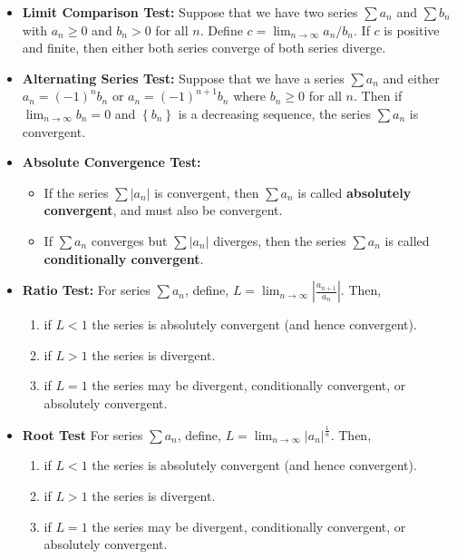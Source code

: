 \documentclass{article}
\newenvironment{bx}[1][]{
\begin{tcolorbox}[colback=white!97!black, title=#1, arc=0in, halign=flush left, left=1mm, right=1mm,]
}{
\end{tcolorbox}
}
\begin{document}
\begin{multicols}{2}
\begin{bx}[Test for Convergence and Divergence]
\begin{itemize}[leftmargin=1em]
\item \textbf{Limit Comparison Test:}
Suppose that we have two series $\sum a_n$ and $\sum b_n$ with $a_n\geq 0$ and $b_n > 0$ for all $n$. Define $c=\lim_{n\to\infty}{a_n}/{b_n}.$ If $c$ is positive and finite, then either both series converge of both series diverge.


\item \textbf{Alternating Series Test:}
Suppose that we have a series $\sum a_{n}$ and either $a_{n}=(-1)^{n} b_{n}$ or $a_{n}=(-1)^{n+1} b_{n}$ where $b_{n} \geq 0$ for all $n .$ Then if ${\displaystyle\lim _{n \to \infty}} b_{n}=0$ and $\left\{b_{n}\right\}$ is a decreasing sequence, the series $\sum a_{n}$ is convergent.


\item \textbf{Absolute Convergence Test:}
\phantom{}
\begin{itemize}[leftmargin=1em]
    \item If the series $\sum |a_n|$ is convergent, then $\sum a_n$ is called \textbf{absolutely convergent}, and must also be convergent.
    \item If $\sum a_n$ converges but $\sum |a_n|$ diverges, then the series $\sum a_n$ is called \textbf{conditionally convergent}.
\end{itemize}


\item \textbf{Ratio Test:}
For series $\sum a_{n}$, define, $ L={\displaystyle\lim _{n \to \infty}} \left|\frac{a_{n+1}}{a_{n}}\right|.$ Then,
\begin{enumerate}[leftmargin=1em]
    \item if $L<1$ the series is absolutely convergent (and hence convergent).
    \item if $L>1$ the series is divergent.
    \item  if $L=1$ the series may be divergent, conditionally convergent, or absolutely convergent.
\end{enumerate}

\item \textbf{Root Test}
For series $\sum a_{n}$, define,
$L={\displaystyle\lim _{n \to \infty}}\left|a_{n}\right|^{\frac{1}{n}}.$ Then,
\begin{enumerate}[leftmargin=1em]
    \item if $L<1$ the series is absolutely convergent (and hence convergent).
    \item if $L>1$ the series is divergent.
    \item if $L=1$ the series may be divergent, conditionally convergent, or absolutely convergent.
\end{enumerate}


\end{itemize}
\end{bx}

\end{multicols}
\end{document}
